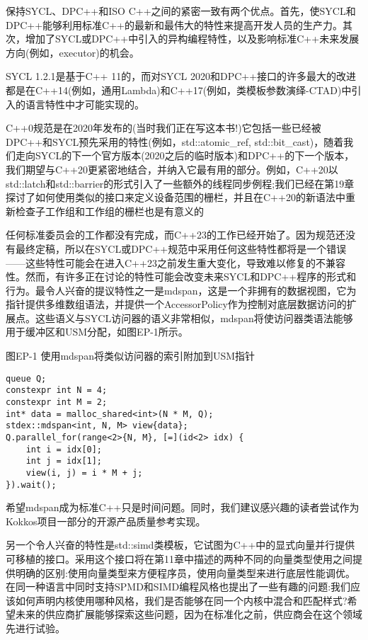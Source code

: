 保持SYCL、DPC++和ISO C++之间的紧密一致有两个优点。首先，使SYCL和DPC++能够利用标准C++的最新和最伟大的特性来提高开发人员的生产力。其次，增加了SYCL或DPC++中引入的异构编程特性，以及影响标准C++未来发展方向(例如，executor)的机会。\par

SYCL 1.2.1是基于C++ 11的，而对SYCL 2020和DPC++接口的许多最大的改进都是在C++14(例如，通用Lambda)和C++17(例如，类模板参数演绎-CTAD)中引入的语言特性中才可能实现的。\par

C++0规范是在2020年发布的(当时我们正在写这本书!)它包括一些已经被DPC++和SYCL预先采用的特性(例如，std::atomic\_ref, std::bit\_cast)，随着我们走向SYCL的下一个官方版本(2020之后的临时版本)和DPC++的下一个版本，我们期望与C++20更紧密地结合，并纳入它最有用的部分。例如，C++20以std::latch和std::barrier的形式引入了一些额外的线程同步例程;我们已经在第19章探讨了如何使用类似的接口来定义设备范围的栅栏，并且在C++20的新语法中重新检查子工作组和工作组的栅栏也是有意义的\par

任何标准委员会的工作都没有完成，而C++23的工作已经开始了。因为规范还没有最终定稿，所以在SYCL或DPC++规范中采用任何这些特性都将是一个错误——这些特性可能会在进入C++23之前发生重大变化，导致难以修复的不兼容性。然而，有许多正在讨论的特性可能会改变未来SYCL和DPC++程序的形式和行为。最令人兴奋的提议特性之一是mdspan，这是一个非拥有的数据视图，它为指针提供多维数组语法，并提供一个AccessorPolicy作为控制对底层数据访问的扩展点。这些语义与SYCL访问器的语义非常相似，mdspan将使访问器类语法能够用于缓冲区和USM分配，如图EP-1所示。\par

\hspace*{\fill} \par %
图EP-1 使用mdspan将类似访问器的索引附加到USM指针
\begin{lstlisting}[caption={}]
queue Q;
constexpr int N = 4;
constexpr int M = 2;
int* data = malloc_shared<int>(N * M, Q);
stdex::mdspan<int, N, M> view{data};
Q.parallel_for(range<2>{N, M}, [=](id<2> idx) {
	int i = idx[0];
	int j = idx[1];
	view(i, j) = i * M + j;
}).wait();
\end{lstlisting}

希望mdspan成为标准C++只是时间问题。同时，我们建议感兴趣的读者尝试作为Kokkos项目一部分的开源产品质量参考实现。\par

另一个令人兴奋的特性是std::simd类模板，它试图为C++中的显式向量并行提供可移植的接口。采用这个接口将在第11章中描述的两种不同的向量类型使用之间提供明确的区别:使用向量类型来方便程序员，使用向量类型来进行底层性能调优。在同一种语言中同时支持SPMD和SIMD编程风格也提出了一些有趣的问题:我们应该如何声明内核使用哪种风格，我们是否能够在同一个内核中混合和匹配样式?希望未来的供应商扩展能够探索这些问题，因为在标准化之前，供应商会在这个领域先进行试验。\par


















